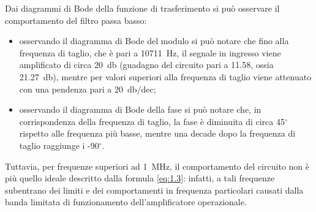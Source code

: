 Dai diagrammi di Bode della funzione di trasferimento si può osservare il comportamento del filtro passa basso:
\begin{itemize}
	\item osservando il diagramma di Bode del modulo si può notare che fino alla frequenza di taglio, che è pari a \SI{10711}{\hertz}, il segnale in ingresso viene amplificato di circa \SI{20}{\decibel} (guadagno del circuito pari a 11.58, ossia \SI{21.27}{\decibel}), mentre per valori superiori alla frequenza di taglio viene attenuato con una pendenza pari a \SI{20}{\decibel}/dec;
	\item osservando il diagramma di Bode della fase si può notare che, in corrispondenza della frequenza di taglio, la fase è diminuita di circa 45$^{\circ}$rispetto alle frequenza più basse, mentre una decade dopo la frequenza di taglio raggiunge i -90$^{\circ}$.
\end{itemize}

Tuttavia, per frequenze superiori ad \SI{1}{\mega\hertz}, il comportamento del circuito non è più quello ideale descritto dalla formula \ref{eq:1.3}: infatti, a tali frequenze subentrano dei limiti e dei comportamenti in frequenza particolari causati dalla banda limitata di funzionamento dell'amplificatore operazionale.



